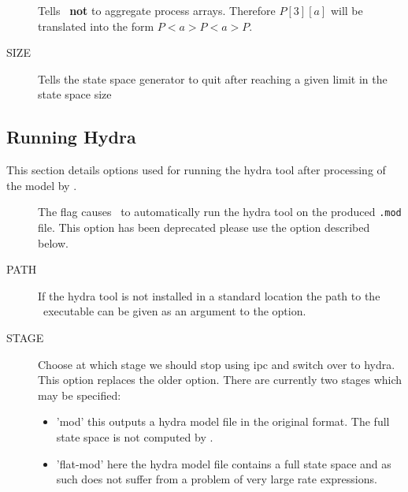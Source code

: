 \begin{description}
\item[ ]
Tells \commandNameIpcSmc\ \textbf{not} to aggregate
process arrays. Therefore $P[3][a]$ will be translated
into the form $P <a> P <a> P$.

\end{description}

\begin{description}
\item[ SIZE]
Tells the state space generator to quit after reaching a
given limit in the state space size

\end{description}


\subsection{Running Hydra}
This section details options used for running
the hydra tool after processing of the model by \ipc.

\begin{description}
\item[ ]
The flag  causes \commandNameIpcSmc\ to
automatically run the hydra tool on the produced
\texttt{.mod} file.
This option has been deprecated please use the
 option described below.

\end{description}

\begin{description}
\item[ PATH]
If the hydra tool is not installed in a standard
location the path to the \hydra\ executable can
be given as an argument to the  option.

\end{description}

\begin{description}
\item[ STAGE]
Choose at which stage we should stop using ipc
and switch over to hydra.
 This option replaces the older  option.
There are currently two stages which may be specified:
\begin{itemize}
\item 'mod' this outputs a hydra model file in the original
format. The full state space is not computed by \ipc.
\item 'flat-mod' here the hydra model file contains a full
state space and as such does not suffer from a problem of
very large rate expressions.
\end{itemize}

\end{description}


